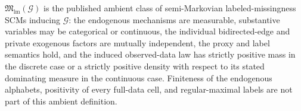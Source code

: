 \(\mathfrak M_{\mathrm{lm}}(\mathcal G)\) is the published ambient class of semi-Markovian labeled-missingness SCMs inducing \(\mathcal G\): the endogenous mechanisms are measurable, substantive variables may be categorical or continuous, the individual bidirected-edge and private exogenous factors are mutually independent, the proxy and label semantics hold, and the induced observed-data law has strictly positive mass in the discrete case or a strictly positive density with respect to its stated dominating measure in the continuous case. Finiteness of the endogenous alphabets, positivity of every full-data cell, and regular-maximal labels are not part of this ambient definition.